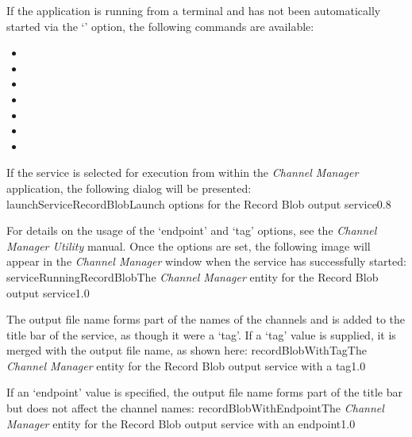 If the application is running from a terminal and has not been automatically started via
the `' option, the following commands are available:
\begin{itemize}
\item{}
\item\exSp{}
\item\exSp{}
\item\exSp{}
\item\exSp{}
\item\exSp{}
\item\exSp{}
\end{itemize}
\condPage
If the service is selected for execution from within the \emph{Channel Manager}
application, the following dialog will be presented:
%
{launchServiceRecordBlob}{Launch options for the Record Blob output service}{0.8}

For details on the usage of the `endpoint' and `tag' options, see the \emph{Channel
Manager Utility} manual.
Once the options are set, the following image will appear in the \emph{Channel Manager}
window when the service has successfully started:
%
{serviceRunningRecordBlob}{The \emph{Channel Manager} entity for the Record Blob output
service}{1.0}

The output file name forms part of the names of the channels and is added to the title bar
of the service, as though it were a `tag'.
\condPage{}
If a `tag' value is supplied, it is merged with the output file name, as shown here:
%
{recordBlobWithTag}{The \emph{Channel Manager} entity for the Record Blob output service
with a tag}{1.0}

If an `endpoint' value is specified, the output file name forms part of the title bar but
does not affect the channel names:
%
{recordBlobWithEndpoint}{The \emph{Channel Manager} entity for the Record Blob output
service with an endpoint}{1.0}


